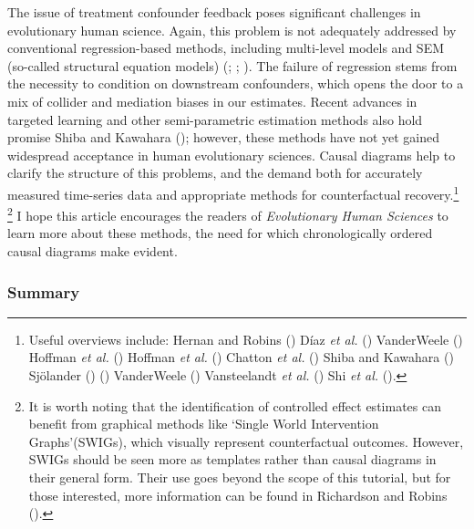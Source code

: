 \documentclass[
  singlecolumn,
  9pt]{article}
\begin{document}
The issue of treatment confounder feedback poses significant challenges
in evolutionary human science. Again, this problem is not adequately
addressed by conventional regression-based methods, including
multi-level models and SEM (so-called structural equation models)
(;
; ). The failure of regression stems from the necessity
to condition on downstream confounders, which opens the door to a mix of
collider and mediation biases in our estimates. Recent advances in
targeted learning and other semi-parametric estimation methods also hold
promise Shiba and Kawahara (); however,
these methods have not yet gained widespread acceptance in human
evolutionary sciences. Causal diagrams help to clarify the structure of
this problems, and the demand both for accurately measured time-series
data and appropriate methods for counterfactual recovery.\footnote{Useful
  overviews include: Hernan and Robins ()
  Díaz \emph{et al.} () VanderWeele
  () Hoffman \emph{et al.}
  () Hoffman \emph{et al.}
  () Chatton \emph{et al.}
  () Shiba and Kawahara
  () Sjölander
  ()
  () VanderWeele
  () Vansteelandt \emph{et al.}
  () Shi \emph{et al.}
  ().} \footnote{It is worth noting that the
  identification of controlled effect estimates can benefit from
  graphical methods like `Single World Intervention Graphs'(SWIGs),
  which visually represent counterfactual outcomes. However, SWIGs
  should be seen more as templates rather than causal diagrams in their
  general form. Their use goes beyond the scope of this tutorial, but
  for those interested, more information can be found in Richardson and
  Robins ().} I hope this article
encourages the readers of \emph{Evolutionary Human Sciences} to learn
more about these methods, the need for which chronologically ordered
causal diagrams make evident.

\subsubsection{Summary}\label{summary}
\end{document}
